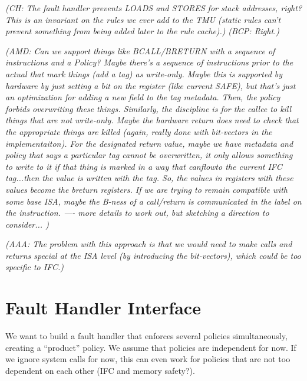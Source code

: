 \documentclass{article}
\newcommand{\bcp}[1]{{\color{blue}\em (BCP: #1)}}
\newcommand{\amd}[1]{{\color{purple}\em (AMD: #1)}}
\newcommand{\ch}[1]{{\color{dkblue}\em (CH: #1)}}
\newcommand{\aaa}[1]{{\color{dkgreen}\em (AAA: #1)}}
\begin{document}
\ch{The fault handler prevents LOADS and STORES for stack addresses,
  right?  This is an invariant on the rules we ever add to the TMU
  (static rules can't prevent something from being added later to the
  rule cache).}
\bcp{Right.}

\amd{Can we support things like BCALL/BRETURN with a sequence of
  instructions and a Policy?  Maybe there's a sequence of instructions
  prior to the actual that mark things (add a tag) as write-only.  Maybe
  this is supported by hardware by just setting a bit on the register (like
  current SAFE), but that's just an optimization for adding a new field to
  the tag metadata.  Then, the policy forbids overwriting these things.
  Similarly, the discipline is for the callee to kill things that are not
  write-only.   Maybe the hardware return does need to check that the
  appropriate things are killed (again, really done with bit-vectors in the
  implementaiton).  For the designated return value, maybe we have metadata
  and policy that says a particular tag cannot be overwritten, it only
  allows something to write to it if that thing is marked in a way that
  canflowto the current IFC tag...then the value is written with the tag.
  So, the values in registers with these values become the breturn
  registers.   If we are trying to remain compatible with some base ISA,
  maybe the B-ness of a call/return is communicated in the label on the
  instruction. ---- more details to work out, but sketching a direction to consider...   }

\aaa{The problem with this approach is that we would need to make
  calls and returns special at the ISA level (by introducing the
  bit-vectors), which could be too specific to IFC.}

\section{Fault Handler Interface}

We want to build a fault handler that enforces several policies
simultaneously, creating a ``product'' policy. We assume that policies
are independent for now. If we ignore system calls for now, this can
even work for policies that are not too dependent on each other (IFC
and memory safety?).
\end{document}

